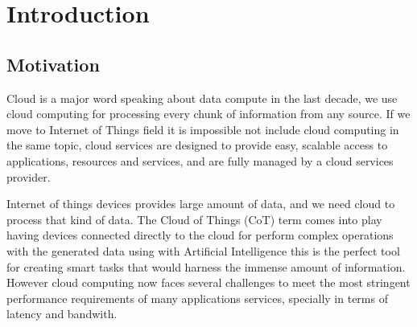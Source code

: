 
\cleardoublepage


\chapter{Introduction}
\label{makereference}



\section{Motivation}
\label{makereference1.1}

Cloud is a major word speaking about data compute in the last decade, we use cloud computing for processing every chunk of information from any source. 
If we move to Internet of Things field it is impossible not include cloud computing in the same topic, cloud services are designed to provide easy, scalable access to applications, resources and services, and are fully managed by a cloud services provider.~\cite{cloud_def}  

Internet of things devices provides large amount of data, and we need cloud to process that kind of data. The Cloud of Things (CoT) term comes into play having devices connected directly to the cloud for perform complex operations with the generated data using with Artificial Intelligence this is the perfect tool for creating smart tasks that would harness the immense amount of information.
However cloud computing now faces several challenges to meet the most stringent performance requirements of many applications services, specially in terms of latency and bandwith.~\cite{IEE:Morabito:2017}

